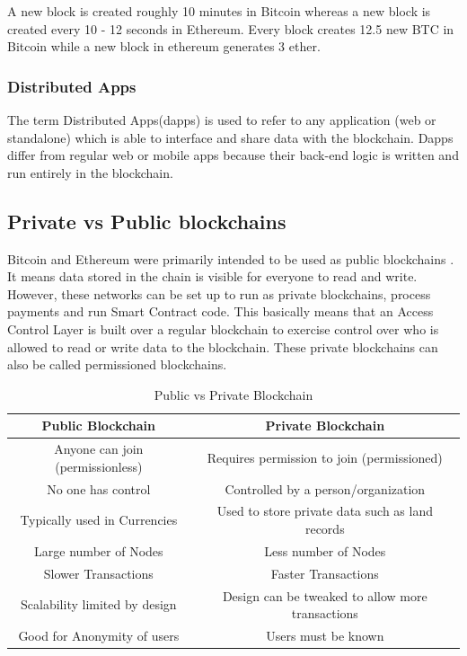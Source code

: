 \documentclass[11pt,openright]{report}
\begin{document}
A new block is created roughly 10 minutes in Bitcoin whereas a new block is created every 10 - 12 seconds in Ethereum. Every block creates 12.5 new BTC in Bitcoin while a new block in ethereum generates 3 ether.

\subsubsection{Distributed Apps}
The term Distributed Apps(dapps) is used to refer to any application (web or standalone) which is able to interface and share data with the blockchain. 
Dapps differ from regular web or mobile apps because their back-end logic is written and run entirely in the blockchain.

\subsection{Private vs Public blockchains}
Bitcoin and Ethereum were primarily intended to be used as public blockchains \cite{privpubarticle}. It means data stored in the chain is visible for everyone to read and write. However, these networks can be set up to run as private blockchains, process payments and run Smart Contract code. This basically means that an Access Control Layer is built over a regular blockchain to exercise control over who is allowed to read or write data to the blockchain. These private blockchains can also be called permissioned blockchains.
\newline
\newline
\begin{table}[!htbp]
	\renewcommand{\arraystretch}{1.3}
	\caption{Public vs Private Blockchain}
	\label{pub_priv_blockchains}
	\centering
	\begin{tabular}{|c|c|}
		\hline
		\bfseries Public Blockchain & \bfseries Private Blockchain \\
		\hline\hline
		Anyone can join (permissionless) & Requires permission to join (permissioned) \\ \hline
	    No one has control & Controlled by a person/organization \\ \hline
        Typically used in Currencies & Used to store private data such as land records \\ \hline
        Large number of Nodes & Less number of Nodes \\ \hline
        Slower Transactions  & Faster Transactions \\ \hline
        Scalability limited by design  & Design can be tweaked to allow more transactions \\ \hline
        Good for Anonymity of users  & Users must be known \\ \hline
	\end{tabular}
\end{table}
\newline
\newline
\end{document}
